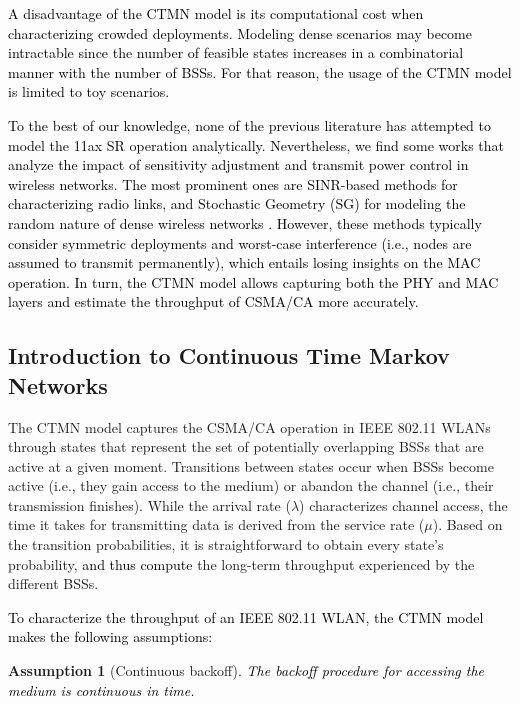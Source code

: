 \documentclass[preprint,12pt]{elsarticle}
\theoremstyle{plain}
\newtheorem{assumption}{Assumption}
\begin{document}
\textcolor{black}{A disadvantage of the CTMN model is its computational cost when characterizing crowded deployments. Modeling dense scenarios may become intractable since the number of feasible states increases in a combinatorial manner with the number of BSSs. For that reason, the usage of the CTMN model is limited to toy scenarios.}

\textcolor{black}{To the best of our knowledge, none of the previous literature has attempted to model the 11ax SR operation analytically. Nevertheless, we find some works that analyze the impact of sensitivity adjustment and transmit power control in wireless networks. The most prominent ones are SINR-based methods \cite{gupta2000capacity, guo2003spatial} for characterizing radio links, and Stochastic Geometry (SG) for modeling the random nature of dense wireless networks \cite{zhao2016stochastic, zhang2015stochastic, iwata2019stochastic, nguyen2007stochastic}. However, these methods typically consider symmetric deployments and worst-case interference (i.e., nodes are assumed to transmit permanently), which entails losing insights on the MAC operation. In turn, the CTMN model allows capturing both the PHY and MAC layers and estimate the throughput of CSMA/CA more accurately.} 

\subsection{Introduction to Continuous Time Markov Networks}
The CTMN model captures the CSMA/CA operation in IEEE 802.11 WLANs through states that represent the set of potentially overlapping BSSs that are active at a given moment. Transitions between states occur when BSSs become active (i.e., they gain access to the medium) or abandon the channel (i.e., their transmission finishes). While the arrival rate ($\lambda$) characterizes channel access, the time it takes for transmitting data is derived from the service rate ($\mu$). Based on the transition probabilities, it is straightforward to obtain every state's probability, \textcolor{black}{and thus compute} the long-term throughput experienced by the different BSSs.

\textcolor{black}{To characterize the throughput of an IEEE 802.11 WLAN, the CTMN model makes the following assumptions:}

\begin{assumption}[Continuous backoff]\label{as:1} \textcolor{black}{The backoff procedure for accessing the medium is continuous in time.}\end{assumption}
\end{document}
